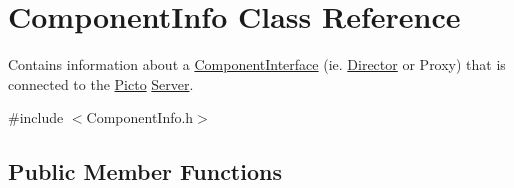 \hypertarget{class_component_info}{\section{Component\-Info Class Reference}
\label{class_component_info}
}


Contains information about a \hyperlink{class_component_interface}{Component\-Interface} (ie. \hyperlink{class_director}{Director} or Proxy) that is connected to the \hyperlink{namespace_picto}{Picto} \hyperlink{class_server}{Server}.  




{\ttfamily \#include $<$Component\-Info.\-h$>$}

\subsection*{Public Member Functions}
